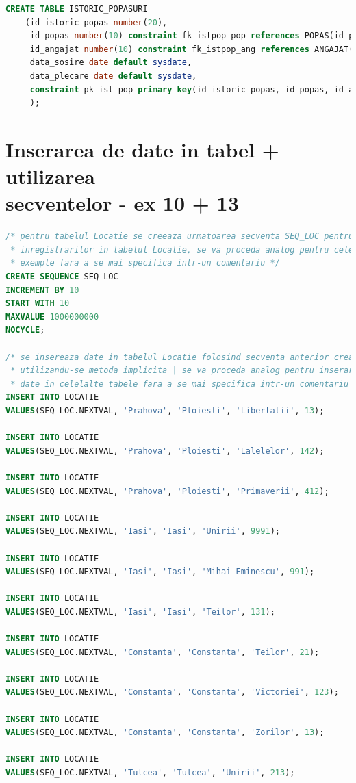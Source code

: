 \documentclass[12pt, a4paper]{article}
\begin{document}
\begin{lstlisting}[language=SQL]
CREATE TABLE ISTORIC_POPASURI
    (id_istoric_popas number(20),
     id_popas number(10) constraint fk_istpop_pop references POPAS(id_popas),
     id_angajat number(10) constraint fk_istpop_ang references ANGAJAT(id_angajat),
     data_sosire date default sysdate,
     data_plecare date default sysdate,
     constraint pk_ist_pop primary key(id_istoric_popas, id_popas, id_angajat, data_sosire)
     );
\end{lstlisting}

\newpage
\section{Inserarea de date in tabel + utilizarea \\secventelor - ex 10 + 13}
\begin{lstlisting}[language=SQL]
/* pentru tabelul Locatie se creeaza urmatoarea secventa SEQ_LOC pentru inserarea
 * inregistrarilor in tabelul Locatie, se va proceda analog pentru celelalte
 * exemple fara a se mai specifica intr-un comentariu */
CREATE SEQUENCE SEQ_LOC
INCREMENT BY 10
START WITH 10
MAXVALUE 1000000000
NOCYCLE;

/* se insereaza date in tabelul Locatie folosind secventa anterior creata
 * utilizandu-se metoda implicita | se va proceda analog pentru inserarea de
 * date in celelalte tabele fara a se mai specifica intr-un comentariu */
INSERT INTO LOCATIE
VALUES(SEQ_LOC.NEXTVAL, 'Prahova', 'Ploiesti', 'Libertatii', 13);

INSERT INTO LOCATIE
VALUES(SEQ_LOC.NEXTVAL, 'Prahova', 'Ploiesti', 'Lalelelor', 142);

INSERT INTO LOCATIE
VALUES(SEQ_LOC.NEXTVAL, 'Prahova', 'Ploiesti', 'Primaverii', 412);

INSERT INTO LOCATIE
VALUES(SEQ_LOC.NEXTVAL, 'Iasi', 'Iasi', 'Unirii', 9991);

INSERT INTO LOCATIE
VALUES(SEQ_LOC.NEXTVAL, 'Iasi', 'Iasi', 'Mihai Eminescu', 991);

INSERT INTO LOCATIE
VALUES(SEQ_LOC.NEXTVAL, 'Iasi', 'Iasi', 'Teilor', 131);

INSERT INTO LOCATIE
VALUES(SEQ_LOC.NEXTVAL, 'Constanta', 'Constanta', 'Teilor', 21);

INSERT INTO LOCATIE
VALUES(SEQ_LOC.NEXTVAL, 'Constanta', 'Constanta', 'Victoriei', 123);

INSERT INTO LOCATIE
VALUES(SEQ_LOC.NEXTVAL, 'Constanta', 'Constanta', 'Zorilor', 13);

INSERT INTO LOCATIE
VALUES(SEQ_LOC.NEXTVAL, 'Tulcea', 'Tulcea', 'Unirii', 213);


\end{lstlisting}
\end{document}
